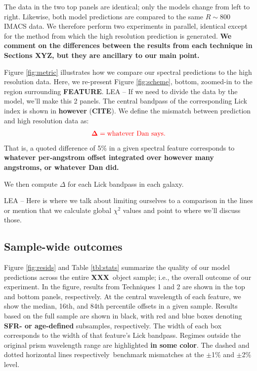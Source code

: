 \documentclass[a4paper,fleqn,usenatbib]{mnras}
\newcommand{\resp}{respectively}
\newcommand{\bfr}{\bf\color{red}}
\newcommand{\bfb}{\color{myblue}}
\newcommand{\ntot}{{\bfr XXX}} %
\newcommand{\CITE}{{\bfr CITE}}
\begin{document}
The data in the two top panels are identical; only the models change from left to right. Likewise,
both model predictions are compared to the same $R\sim800$ IMACS data. We therefore perform two 
experiments in parallel, identical except for the method from which the high resolution prediction is 
generated. {\bfr We comment on the differences between the results from each
technique in Sections XYZ, but they are ancillary to our main point.}

Figure \ref{fig:metric} illustrates how we compare our spectral predictions to the high resolution data.
Here, we re-present Figure \ref{fig:scheme}, bottom, zoomed-in to the region surrounding {\bfr FEATURE}.
{\bfb LEA -- If we need to divide the data by the model, we'll make this 2 panels.} The central 
bandpass of the corresponding Lick index is shown in {\bfr however} (\CITE). We define 
the mismatch between prediction and high resolution data as:
\begin{equation}
	\bfr \Delta = {\rm whatever~Dan~says}.
\end{equation}
That is, a quoted difference of 5\% in a given spectral feature corresponds to {\bfr whatever per-angstrom
offset integrated over however many angstroms, or whatever Dan did.}

We then compute {\bfr$\Delta$} for each Lick bandpass in each galaxy.

{\bfb LEA -- Here is where we talk about limiting ourselves to a comparison in the lines or mention
that we calculate global $\chi^{2}$ values and point to where we'll discuss those.}

\subsection{Sample-wide outcomes}
\label{sec:upshot}

Figure \ref{fig:resids} and Table \ref{tbl:stats} summarize the quality of our model predictions 
across the entire \ntot\ object sample; i.e., the overall outcome of our experiment. In the figure, 
results from Techniques 1 and 2 are shown in the top and bottom panels, \resp. At the central 
wavelength of each feature, we show the median, 16th, and 84th percentile offsets in a given sample. 
Results based on the full sample are shown in black, with red and blue boxes denoting 
{\bfr SFR- or age-defined} subsamples, \resp. The width of each box corresponds to the width of 
that feature's Lick bandpass. Regimes outside the original prism wavelength range are highlighted 
{\bfr in some color}. The dashed and dotted horizontal lines \resp\ benchmark mismatches at the 
$\pm$1\% and $\pm$2\% level.
\end{document}

